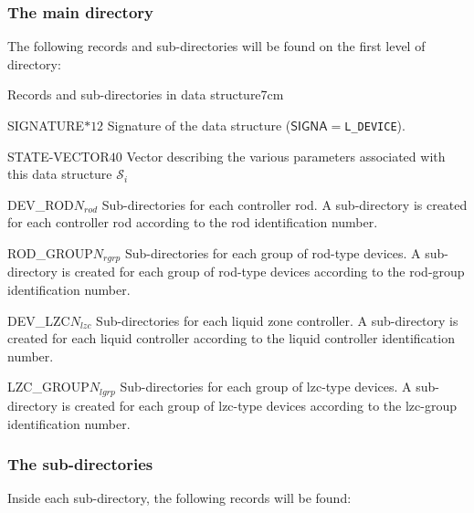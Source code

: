 \subsubsection{The main  directory}\label{sect:devicedir}
\noindent
The following records and sub-directories will be found on the first level
of  directory:

\begin{DescriptionEnregistrement}{Records and sub-directories in 
data structure}{7cm} 

\CharEnr
{SIGNATURE}{$*12$}
{Signature of the  data structure ($\mathsf{SIGNA}=${\tt L\_DEVICE}).}

\IntEnr
{STATE-VECTOR}{$40$}
{Vector describing the various parameters associated with this data structure $\mathcal{S}_i$}

\DirlEnr
{DEV\_ROD}{$N_{rod}$}
{Sub-directories for each controller rod. A sub-directory is created for each
 controller rod according to the rod identification number.}

\DirlEnr
{ROD\_GROUP}{$N_{rgrp}$}
{Sub-directories for each group of rod-type devices. A sub-directory is created for
 each group of rod-type devices according to the rod-group identification number.}

\DirlEnr
{DEV\_LZC}{$N_{lzc}$}
{Sub-directories for each liquid zone controller. A sub-directory is created for
 each liquid controller according to the liquid controller identification number.}

\DirlEnr
{LZC\_GROUP}{$N_{lgrp}$}
{Sub-directories for each group of lzc-type devices. A sub-directory is created for
 each group of lzc-type devices according to the lzc-group identification number.}

\end{DescriptionEnregistrement}

\subsubsection{The  sub-directories}\label{sect:devicerod}

\noindent
Inside each  sub-directory, the following records will be found:

